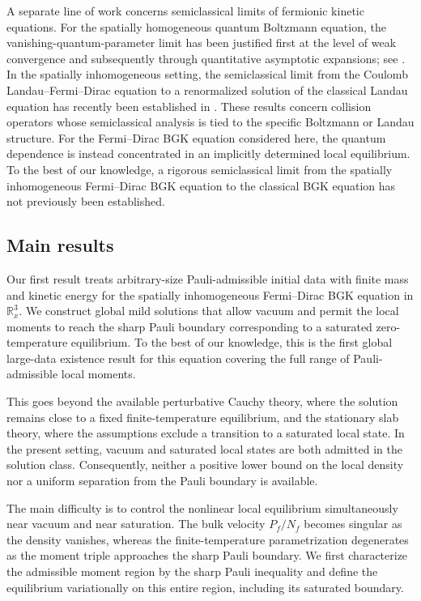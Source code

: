 \documentclass[10pt,reqno]{amsart}
\numberwithin{equation}{section}
\theoremstyle{definition}
\newcommand{\R}{\mathbb R}
\begin{document}
A separate line of work concerns semiclassical limits of fermionic kinetic equations.  For the spatially homogeneous quantum Boltzmann equation, the vanishing-quantum-parameter limit has been justified first at the level of weak convergence and subsequently through quantitative asymptotic expansions; see \cite{HLP21,HLPZ24}.  In the spatially inhomogeneous setting, the semiclassical limit from the Coulomb Landau--Fermi--Dirac equation to a renormalized solution of the classical Landau equation has recently been established in \cite{Sam26}.  These results concern collision operators whose semiclassical analysis is tied to the specific Boltzmann or Landau structure.  For the Fermi--Dirac BGK equation considered here, the quantum dependence is instead concentrated in an implicitly determined local equilibrium.  To the best of our knowledge, a rigorous semiclassical limit from the spatially inhomogeneous Fermi--Dirac BGK equation to the classical BGK equation has not previously been established.

%
%
%
%
%
%

\subsection{Main results}

Our first result treats arbitrary-size Pauli-admissible initial data with finite mass and kinetic energy for the spatially inhomogeneous Fermi--Dirac BGK equation in $\R_x^3$.  We construct global mild solutions that allow vacuum and permit the local moments to reach the sharp Pauli boundary corresponding to a saturated zero-temperature equilibrium. To the best of our knowledge, this is the first global large-data existence result for this equation covering the full range of Pauli-admissible local moments.

This goes beyond the available perturbative Cauchy theory, where the solution remains close to a fixed finite-temperature equilibrium, and the stationary slab theory, where the assumptions exclude a transition to a saturated local state.  In the present setting, vacuum and saturated local states are both admitted in the solution class.  Consequently, neither a positive lower bound on the local density nor a uniform separation from the Pauli boundary is available.
 
The main difficulty is to control the nonlinear local equilibrium simultaneously near vacuum and near saturation. The bulk velocity $P_f/N_f$ becomes singular as the density vanishes, whereas the finite-temperature parametrization degenerates as the moment triple approaches the sharp Pauli boundary. We first characterize the admissible moment region by the sharp Pauli inequality and define the equilibrium variationally on this entire region, including its saturated boundary.
\end{document}
